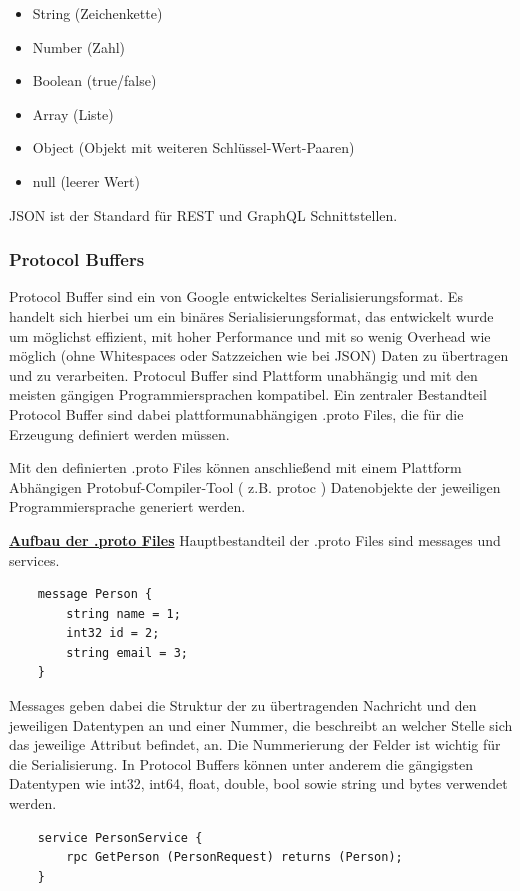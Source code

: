 \begin{itemize}
	\item String (Zeichenkette)
	\item Number (Zahl)
	\item Boolean (true/false)
	\item Array (Liste)
	\item Object (Objekt mit weiteren Schl\"ussel-Wert-Paaren)
	\item null (leerer Wert)
\end{itemize}


JSON ist der Standard für REST und GraphQL Schnittstellen.


\subsubsection{Protocol Buffers}
Protocol Buffer sind ein von Google entwickeltes Serialisierungsformat. Es handelt sich hierbei um ein binäres Serialisierungsformat, das entwickelt wurde um möglichst effizient, mit hoher Performance und mit so wenig Overhead wie möglich (ohne Whitespaces oder Satzzeichen wie bei JSON) Daten zu übertragen und zu verarbeiten. Protocul Buffer sind Plattform unabhängig und mit den meisten gängigen Programmiersprachen kompatibel.
Ein zentraler Bestandteil Protocol Buffer sind dabei plattformunabhängigen .proto Files, die für die Erzeugung definiert werden müssen.

Mit den definierten .proto Files können anschließend mit einem Plattform Abhängigen Protobuf-Compiler-Tool ( z.B. protoc ) Datenobjekte der jeweiligen Programmiersprache generiert werden.


\newpage
\textbf{\underline{Aufbau der .proto Files}}
\newline
Hauptbestandteil der .proto Files sind messages und services.

\begin{verbatim}
	message Person {
		string name = 1;
		int32 id = 2;
		string email = 3;
	}
\end{verbatim}

Messages geben dabei die Struktur der zu übertragenden Nachricht und den jeweiligen Datentypen an und einer Nummer, die beschreibt an welcher Stelle sich das jeweilige Attribut befindet, an. Die Nummerierung der Felder ist wichtig für die Serialisierung.
In Protocol Buffers können unter anderem die gängigsten Datentypen wie int32, int64, float, double, bool sowie string und bytes verwendet werden.

\begin{verbatim}
	service PersonService {
		rpc GetPerson (PersonRequest) returns (Person);
	}
\end{verbatim}

